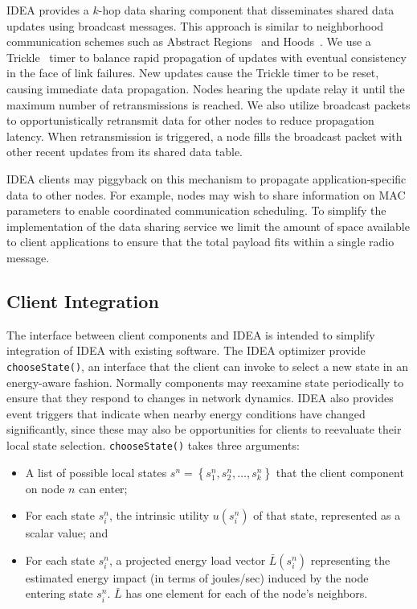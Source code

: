 \documentclass{sig-alternate}
\begin{document}
IDEA provides a $k$-hop data sharing component that disseminates shared data
updates using broadcast messages. This approach is similar to neighborhood
communication schemes such as Abstract Regions~\cite{regions-nsdi04} and
Hoods~\cite{hoods-mobisys}. We use a Trickle~\cite{trickle} timer to balance
rapid propagation of updates with eventual consistency in the face of link
failures. New updates cause the Trickle timer to be reset, causing immediate
data propagation. Nodes hearing the update relay it until the maximum number
of retransmissions is reached. We also utilize broadcast packets to
opportunistically retransmit data for other nodes to reduce propagation
latency. When retransmission is triggered, a node fills the broadcast packet
with other recent updates from its shared data table.

IDEA clients may piggyback on this mechanism to propagate
application-specific data to other nodes. For example, nodes may wish to
share information on MAC parameters to enable coordinated communication
scheduling. To simplify the implementation of the data sharing service we
limit the amount of space available to client applications to ensure that the
total payload fits within a single radio message.

\subsection{Client Integration}

The interface between client components and IDEA is intended to simplify
integration of IDEA with existing software. The IDEA optimizer provide
\texttt{chooseState()}, an interface that the client can invoke to select a
new state in an energy-aware fashion. Normally components may reexamine state
periodically to ensure that they respond to changes in network dynamics. IDEA
also provides event triggers that indicate when nearby energy conditions have
changed significantly, since these may also be opportunities for clients to
reevaluate their local state selection. \texttt{chooseState()} takes three
arguments:

\begin{itemize}

\item A list of possible local states $s^n = \left\{ s^n_1, s^n_2, \ldots,
s^n_k\right\}$ that the client component on node $n$ can enter;

\item For each state $s^n_i$, the intrinsic utility $u(s^n_i)$ of that state,
represented as a scalar value; and

\item For each state $s^n_i$, a projected energy load vector $\bar{L}(s^n_i)$
representing the estimated energy impact (in terms of joules/sec) induced by
the node entering state $s^n_i$. $\bar{L}$ has one element for each of the
node's neighbors.

\end{itemize}
\end{document}
